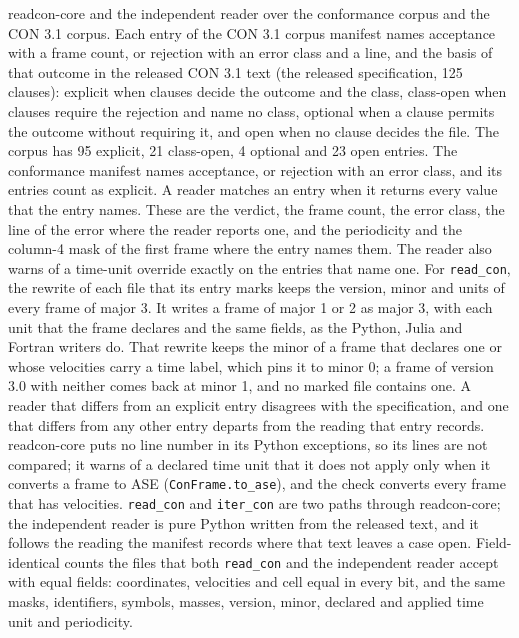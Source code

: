 \begin{table}[tbp]
\centering
\small
\caption{readcon-core and the independent reader over the conformance corpus and the CON 3.1 corpus.
Each entry of the CON 3.1 corpus manifest names acceptance with a frame count, or rejection with an error class and a line, and the basis of that outcome in the released CON 3.1 text (the released specification, 125 clauses): explicit when clauses decide the outcome and the class, class-open when clauses require the rejection and name no class, optional when a clause permits the outcome without requiring it, and open when no clause decides the file.
The corpus has 95 explicit, 21 class-open, 4 optional and 23 open entries.
The conformance manifest names acceptance, or rejection with an error class, and its entries count as explicit.
A reader matches an entry when it returns every value that the entry names.
These are the verdict, the frame count, the error class, the line of the error where the reader reports one, and the periodicity and the column-4 mask of the first frame where the entry names them.
The reader also warns of a time-unit override exactly on the entries that name one.
For \texttt{read\_con}, the rewrite of each file that its entry marks keeps the version, minor and units of every frame of major 3.
It writes a frame of major 1 or 2 as major 3, with each unit that the frame declares and the same fields, as the Python, Julia and Fortran writers do.
That rewrite keeps the minor of a frame that declares one or whose velocities carry a time label, which pins it to minor 0; a frame of version 3.0 with neither comes back at minor 1, and no marked file contains one.
A reader that differs from an explicit entry disagrees with the specification, and one that differs from any other entry departs from the reading that entry records.
readcon-core \readconCargoVersion{} puts no line number in its Python exceptions, so its lines are not compared; it warns of a declared time unit that it does not apply only when it converts a frame to ASE (\texttt{ConFrame.to\_ase}), and the check converts every frame that has velocities.
\texttt{read\_con} and \texttt{iter\_con} are two paths through readcon-core; the independent reader is pure Python written from the released text, and it follows the reading the manifest records where that text leaves a case open.
Field-identical counts the files that both \texttt{read\_con} and the independent reader accept with equal fields: coordinates, velocities and cell equal in every bit, and the same masks, identifiers, symbols, masses, version, minor, declared and applied time unit and periodicity.}

\end{table}
